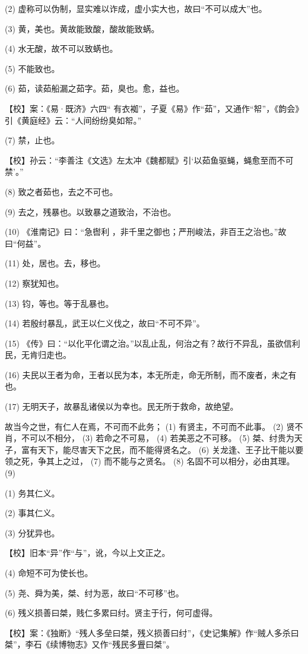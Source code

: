 \documentclass[12pt,UTF8]{ctexbook}
\begin{document}
(2) 虚称可以伪制，显实难以诈成，虚小实大也，故曰“不可以成大”也。

(3) 黄，美也。黄故能致酸，酸故能致蜹。

(4) 水无酸，故不可以致蜹也。

(5) 不能致也。

(6) 茹，读茹船漏之茹字。茹，臭也。愈，益也。

【校】案：《易·既济》六四“ 有衣袽”，子夏《易》作“茹”，又通作“帤”，《韵会》引《黄庭经》云：“人间纷纷臭如帤。”

(7) 禁，止也。

【校】孙云：“李善注《文选》左太冲《魏都赋》引‘以茹鱼驱蝇，蝇愈至而不可禁’。”

(8) 致之者茹也，去之不可也。

(9) 去之，残暴也。以致暴之道致治，不治也。

(10) 《淮南记》曰：“急辔利 ，非千里之御也；严刑峻法，非百王之治也。”故曰“何益”。

(11) 处，居也。去，移也。

(12) 察犹知也。

(13) 钧，等也。等于乱暴也。

(14) 若殷纣暴乱，武王以仁义伐之，故曰“不可不异”。

(15) 《传》曰：“以化平化谓之治。”以乱止乱，何治之有？故行不异乱，虽欲信利民，无肯归走也。

(16) 夫民以王者为命，王者以民为本，本无所走，命无所制，而不废者，未之有也。

(17) 无明天子，故暴乱诸侯以为幸也。民无所于救命，故绝望。

故当今之世，有仁人在焉，不可而不此务； (1) 有贤主，不可而不此事。 (2) 贤不肖，不可以不相分， (3) 若命之不可易， (4) 若美恶之不可移。 (5) 桀、纣贵为天子，富有天下，能尽害天下之民，而不能得贤名之。 (6) 关龙逢、王子比干能以要领之死，争其上之过， (7) 而不能与之贤名。 (8) 名固不可以相分，必由其理。 (9)

(1) 务其仁义。

(2) 事其仁义。

(3) 分犹异也。

【校】旧本“异”作“与”，讹，今以上文正之。

(4) 命短不可为使长也。

(5) 尧、舜为美，桀、纣为恶，故曰“不可移”也。

(6) 残义损善曰桀，贱仁多累曰纣。贤主于行，何可虚得。

【校】案：《独断》“残人多垒曰桀，残义损善曰纣”，《史记集解》作“贼人多杀曰桀”，李石《续博物志》又作“残民多舋曰桀”。
\end{document}
